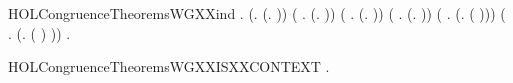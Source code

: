 \begin{SaveVerbatim}{HOLCongruenceTheoremsWGXXind}
\HOLTokenTurnstile{} \HOLSymConst{\HOLTokenForall{}}.
       (\HOLSymConst{\HOLTokenForall{}}.  (\HOLTokenLambda{}. )) \HOLSymConst{\HOLTokenConj{}}
       (\HOLSymConst{\HOLTokenForall{}} .   \HOLSymConst{\HOLTokenImp{}}  (\HOLTokenLambda{}.  )) \HOLSymConst{\HOLTokenConj{}}
       (\HOLSymConst{\HOLTokenForall{}} .   \HOLSymConst{\HOLTokenConj{}}   \HOLSymConst{\HOLTokenImp{}}  (\HOLTokenLambda{}.   \HOLSymConst{+}  )) \HOLSymConst{\HOLTokenConj{}}
       (\HOLSymConst{\HOLTokenForall{}} .   \HOLSymConst{\HOLTokenConj{}}   \HOLSymConst{\HOLTokenImp{}}  (\HOLTokenLambda{}.   \HOLSymConst{\ensuremath{\parallel}}  )) \HOLSymConst{\HOLTokenConj{}}
       (\HOLSymConst{\HOLTokenForall{}} .   \HOLSymConst{\HOLTokenImp{}}  (\HOLTokenLambda{}. \HOLConst{\ensuremath{\nu}}  ( ))) \HOLSymConst{\HOLTokenConj{}}
       (\HOLSymConst{\HOLTokenForall{}} .   \HOLSymConst{\HOLTokenImp{}}  (\HOLTokenLambda{}.  ( ) )) \HOLSymConst{\HOLTokenImp{}}
       \HOLSymConst{\HOLTokenForall{}}.   \HOLSymConst{\HOLTokenImp{}}  
\end{SaveVerbatim}
\newcommand{\HOLCongruenceTheoremsWGXXind}{\UseVerbatim{HOLCongruenceTheoremsWGXXind}}
\begin{SaveVerbatim}{HOLCongruenceTheoremsWGXXISXXCONTEXT}
\HOLTokenTurnstile{} \HOLSymConst{\HOLTokenForall{}}.   \HOLSymConst{\HOLTokenImp{}}  
\end{SaveVerbatim}
